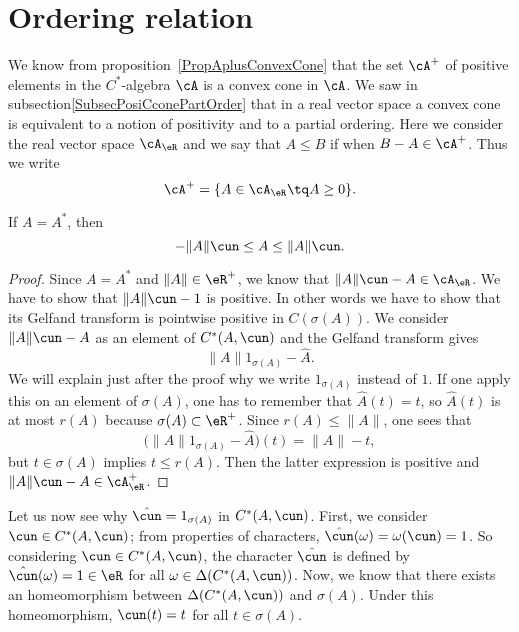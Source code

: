 
\section{Ordering relation}

We know from proposition~\ref{PropAplusConvexCone} that the set \(\cA^+\) of positive elements in the $C^*$-algebra \(\cA\) is a convex cone in \(\cA\). We saw in subsection\ref{SubsecPosiCconePartOrder} that in a real vector space a convex cone is equivalent to a notion of positivity and to a partial ordering. Here we consider the real vector space \(\cA_{\eR}\) and we say that $A\leq B$ if when $B-A\in\cA^+$. Thus we write
\begin{equation}
	\cA^+=\{ A\in\cA_{\eR}\tq  A\geq 0\}.
\end{equation}


\begin{proposition}     \label{PropAAsmAuAAu}
	If $A=A^*$, then
	\[
		-\| A \|\cun\leq A\leq\| A \|\cun.
	\]
\end{proposition}

\begin{proof}
	Since $A=A^*$ and $\| A \|\in\eR^+$, we know that $\| A \|\cun-A\in\cA_{\eR}$. We have to show that $\| A \|\cun-1$ is positive. In other words we have to show that its Gelfand transform is pointwise positive in $C(\sigma(A))$. We consider $\| A \|\cun-A$ as an element of $C^*(A,\cun)$ and the Gelfand transform gives
	\[
		\| A \|1_{\sigma(A)}-\hat A.
	\]
	We will explain just after the proof why we write $1_{\sigma(A)}$ instead of $1$. If one apply this on an element of $\sigma(A)$, one has to remember that $\hat A(t)=t$, so $\hat A(t)$ is at most $r(A)$ because $\sigma(A)\subset\eR^+$. Since $r(A)\leq\| A \|$, one sees that
	\begin{equation}
		\big( \| A \|1_{\sigma(A)}-\hat A \big)(t)=\| A \|-t,
	\end{equation}
	but $t\in\sigma(A)$ implies $t\leq r(A)$. Then the latter expression is positive and $\| A \|\cun-A\in\cA_{\eR}^+$.

\end{proof}

Let us now see why $\hat \cun=1_{\sigma(A)}$ in $C^*(A,\cun)$. First, we consider $\cun\in C^*(A,\cun)$; from properties of characters, $\hat\cun(\omega)=\omega(\cun)=1$. So considering $\cun\in C^*(A,\cun)$, the character $\hat\cun$ is defined by $\hat\cun(\omega)=1\in\eR$ for all $\omega\in\Delta(C^*(A,\cun))$. Now, we know that there exists an homeomorphism between $\Delta(C^*(A,\cun))$ and $\sigma(A)$. Under this homeomorphism, $\cun(t)=t$ for all $t\in\sigma(A)$.

